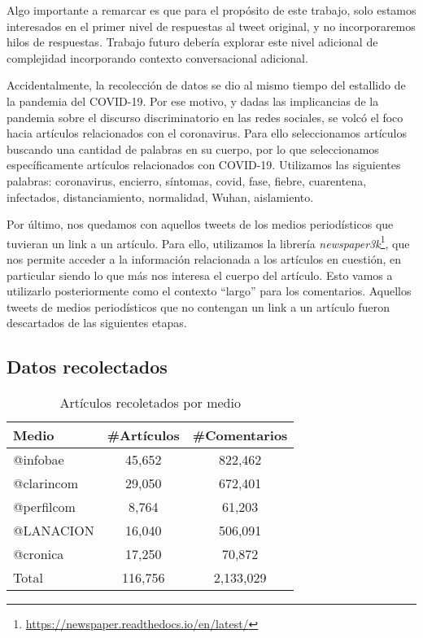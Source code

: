 Algo importante a remarcar es que para el propósito de este trabajo, solo estamos interesados en el primer nivel de respuestas al tweet original, y no incorporaremos hilos de respuestas. Trabajo futuro debería explorar este nivel adicional de complejidad incorporando contexto conversacional adicional.

Accidentalmente, la recolección de datos se dio al mismo tiempo del estallido de la pandemia del COVID-19. Por ese motivo, y dadas las implicancias de la pandemia sobre el discurso discriminatorio en las redes sociales, se volcó el foco hacia artículos relacionados con el coronavirus. Para ello seleccionamos artículos buscando una cantidad de palabras en su cuerpo, por lo que seleccionamos específicamente artículos relacionados con COVID-19. Utilizamos las siguientes palabras: coronavirus, encierro, síntomas, covid, fase, fiebre, cuarentena, infectados, distanciamiento, normalidad,  Wuhan, aislamiento.

Por último, nos quedamos con aquellos tweets de los medios periodísticos que tuvieran un link a un artículo. Para ello, utilizamos la librería \emph{newspaper3k}\footnote{\url{https://newspaper.readthedocs.io/en/latest/}}, que nos permite acceder a la información relacionada a los artículos en cuestión, en particular siendo lo que más nos interesa el cuerpo del artículo. Esto vamos a utilizarlo posteriormente como el contexto ``largo'' para los comentarios. Aquellos tweets de medios periodísticos que no contengan un link a un artículo fueron descartados de las siguientes etapas.

\subsection{Datos recolectados}

\begin{table}[t]
    \centering
    \begin{tabular}{l|c|c}
    Medio      & \#Artículos & \#Comentarios \\
    \hline
    @infobae   &  45,652   &  822,462 \\
    @clarincom &  29,050   &  672,401 \\
    @perfilcom &  8,764    &  61,203  \\
    @LANACION  &  16,040   &  506,091 \\
    @cronica   &  17,250   &  70,872 \\
    \hline
    Total      & 116,756  & 2,133,029 \\
    \end{tabular}
    \caption{Artículos recoletados por medio}
    \label{tab:articulos_recoletados_por_medio}
\end{table}


